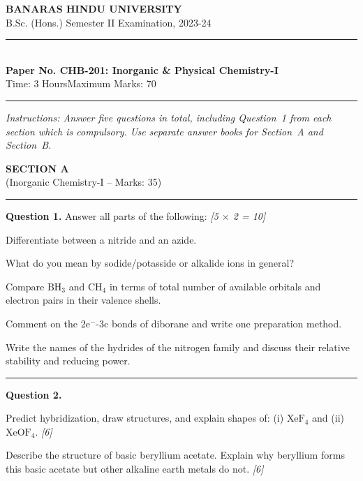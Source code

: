 \documentclass[11pt,a4paper]{article}
\newcommand{\pts}[1]{\hfill   \textit{[#1]}}
\begin{document}
\begin{center}
  {\large\bfseries BANARAS HINDU UNIVERSITY}\\[2pt]
  {\normalsize B.Sc. (Hons.) Semester II Examination, 2023-24}\\[6pt]
  \rule{0.8\linewidth}{0.5pt}\\[6pt]
  {\large\bfseries Paper No. CHB-201: Inorganic \& Physical Chemistry-I}\\[4pt]
  {\normalsize Time: 3 Hours\hfill Maximum Marks: 70}
\end{center}
\rule{\linewidth}{0.4pt}
\small



\noindent   \textit{Instructions: Answer five questions in total, including Question~1 from each section which is compulsory. Use separate answer books for Section~A and Section~B.}

\normalsize
\bigskip


\begin{center}
  {\large\bfseries SECTION A}\\[2pt]
  {\normalsize (Inorganic Chemistry-I -- Marks: 35)}
\end{center}
\rule{0.4\linewidth}{0.2pt}
\smallskip




\noindent   \textbf{Question 1.} Answer all parts of the following: \pts{5 $ \times$ 2 = 10}

\begin{parts}
  \item Differentiate between a nitride and an azide.
  \item What do you mean by sodide/potasside or alkalide ions in general?
  \item Compare $ \text{BH}_3$ and $ \text{CH}_4$ in terms of total number of available orbitals and electron pairs in their valence shells.
  \item Comment on the $2 \text{e}^- \text{-}3 \text{c}$ bonds of diborane and write one preparation method.
  \item Write the names of the hydrides of the nitrogen family and discuss their relative stability and reducing power.
\end{parts}

\medskip\rule{\linewidth}{0.2pt}




\noindent   \textbf{Question 2.}

\begin{parts}
  \item Predict hybridization, draw structures, and explain shapes of: (i) $ \text{XeF}_4$ and (ii) $ \text{XeOF}_4$. \pts{6}
  \item Describe the structure of basic beryllium acetate. Explain why beryllium forms this basic acetate but other alkaline earth metals do not. \pts{6}
\end{parts}
\end{document}
